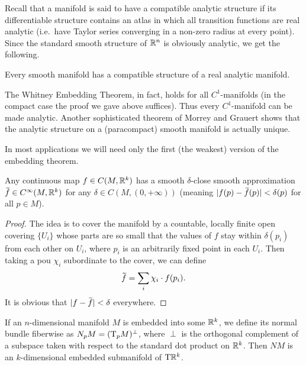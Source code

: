 Recall that a manifold is said to have a compatible analytic structure if its differentiable structure contains an atlas in which all transition functions are real analytic (i.e.\ have Taylor series converging in a non-zero radius at every point). Since the standard smooth structure of $\mathbb{R}^n$ is obviously analytic, we get the following.

\begin{cor}
    Every smooth manifold has a compatible structure of a real analytic manifold.
\end{cor}
\begin{rem}
    The Whitney Embedding Theorem, in fact, holds for all $C^1$-manifolds (in the compact case the proof we gave above suffices). Thus every $C^1$-manifold can be made analytic. Another sophisticated theorem of Morrey and Grauert shows that the analytic structure on a (paracompact) smooth manifold is actually unique.
\end{rem}

In most applications we will need only the first (the weakest) version of the embedding theorem.


\begin{thm}\label{cor 6.22 Lee}
    Any continuous map $f\in C(M,\mathbb{R}^k)$ has a smooth $\delta$-close smooth approximation $\wt{f}\in C^\infty(M,\bbR^k)$ for any $\delta\in C(M,(0,+\infty))$ (meaning $|f(p)-\wt f(p)|<\delta(p)$ for all $p\in M$).
\end{thm}
\begin{proof}
    The idea is to cover the manifold by a countable, locally finite open covering $\{U_i\}$ whose parts are so small that the values of $f$ stay within $\delta(p_i)$ from each other on $U_i$, where $p_i$ is an arbitrarily fixed point in each $U_i$. Then taking a \gls{pou} $\chi_i$ subordinate to the cover, we can define
    \[
        \wt{f}=\sum_i \chi_i\cdot f(p_i).
    \]
    It is obvious that $|f-\wt{f}|<\delta$ everywhere.
\end{proof}

\begin{defn}
    If an $n$-dimensional manifold $M$ is embedded into some $\mathbb{R}^k$, we define its normal bundle fiberwise as $N_p M=(\mathrm{T}_p M)^\perp$, where $\perp$ is the orthogonal complement of a subspace taken with respect to the standard dot product on $\mathbb{R}^k$. Then $NM$ is an $k$-dimensional embedded submanifold of $\mathrm{T}\mathbb{R}^k$.
\end{defn}

